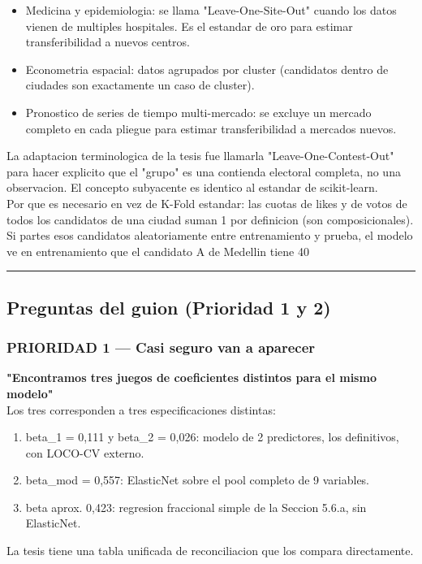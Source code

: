 \documentclass[11pt,a4paper]{article}
\begin{document}
{{{\begin{itemize}[noitemsep,topsep=2pt]
\item Medicina y epidemiologia: se llama "Leave-One-Site-Out" cuando los datos vienen de multiples hospitales. Es el estandar de oro para estimar transferibilidad a nuevos centros.
\item Econometria espacial: datos agrupados por cluster (candidatos dentro de ciudades son exactamente un caso de cluster).
\item Pronostico de series de tiempo multi-mercado: se excluye un mercado completo en cada pliegue para estimar transferibilidad a mercados nuevos.
\end{itemize}

La adaptacion terminologica de la tesis fue llamarla "Leave-One-Contest-Out" para hacer explicito que el "grupo" es una contienda electoral completa, no una observacion. El concepto subyacente es identico al estandar de scikit-learn.\\[2pt]

Por que es necesario en vez de K-Fold estandar: las cuotas de likes y de votos de todos los candidatos de una ciudad suman 1 por definicion (son composicionales). Si partes esos candidatos aleatoriamente entre entrenamiento y prueba, el modelo ve en entrenamiento que el candidato A de Medellin tiene 40%

\vspace{4pt}\noindent\rule{\linewidth}{0.4pt}\vspace{4pt}

\subsection{Preguntas del guion (Prioridad 1 y 2)}

\subsubsection{PRIORIDAD 1 — Casi seguro van a aparecer}

\textbf{"Encontramos tres juegos de coeficientes distintos para el mismo modelo"}\\[2pt]
Los tres corresponden a tres especificaciones distintas:\\[2pt]
\begin{enumerate}[noitemsep,topsep=2pt]
\item beta_1 = 0,111 y beta_2 = 0,026: modelo de 2 predictores, los definitivos, con LOCO-CV externo.
\item beta_mod = 0,557: ElasticNet sobre el pool completo de 9 variables.
\item beta aprox. 0,423: regresion fraccional simple de la Seccion 5.6.a, sin ElasticNet.
\end{enumerate}
La tesis tiene una tabla unificada de reconciliacion que los compara directamente.\\[2pt]

}}}
\end{document}
